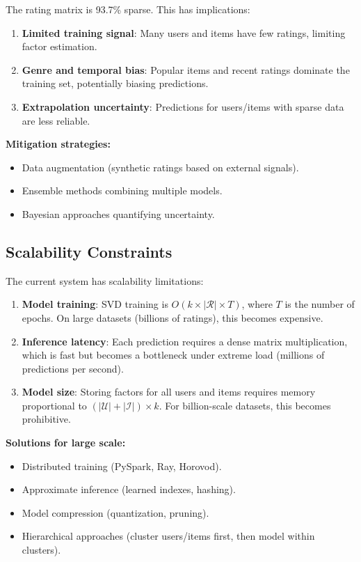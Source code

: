 The rating matrix is 93.7\% sparse. This has implications:

\begin{enumerate}
  \item \textbf{Limited training signal}: Many users and items have few ratings, limiting factor estimation.
  
  \item \textbf{Genre and temporal bias}: Popular items and recent ratings dominate the training set, 
  potentially biasing predictions.
  
  \item \textbf{Extrapolation uncertainty}: Predictions for users/items with sparse data are less reliable.
\end{enumerate}

\textbf{Mitigation strategies:}
\begin{itemize}
  \item Data augmentation (synthetic ratings based on external signals).
  \item Ensemble methods combining multiple models.
  \item Bayesian approaches quantifying uncertainty.
\end{itemize}

\subsection{Scalability Constraints}

The current system has scalability limitations:

\begin{enumerate}
  \item \textbf{Model training}: SVD training is $O(k \times |\mathcal{R}| \times T)$, where $T$ is the number of epochs. 
  On large datasets (billions of ratings), this becomes expensive.
  
  \item \textbf{Inference latency}: Each prediction requires a dense matrix multiplication, which is fast but 
  becomes a bottleneck under extreme load (millions of predictions per second).
  
  \item \textbf{Model size}: Storing factors for all users and items requires memory proportional to 
  $(|\mathcal{U}| + |\mathcal{I}|) \times k$. For billion-scale datasets, this becomes prohibitive.
\end{enumerate}

\textbf{Solutions for large scale:}
\begin{itemize}
  \item Distributed training (PySpark, Ray, Horovod).
  \item Approximate inference (learned indexes, hashing).
  \item Model compression (quantization, pruning).
  \item Hierarchical approaches (cluster users/items first, then model within clusters).
\end{itemize}

